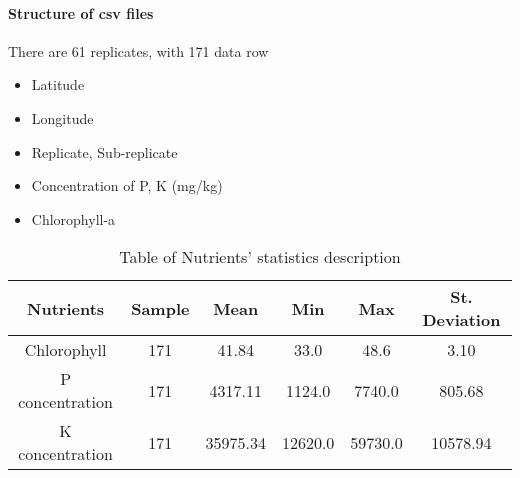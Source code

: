 \paragraph{Structure of csv files}
There are 61 replicates, with 171 data row
\begin{itemize}
    \item Latitude
    \item Longitude
    \item Replicate, Sub-replicate
    \item Concentration of P, K (mg/kg)
    \item Chlorophyll-a
\end{itemize}

\begin{table}[H]
    \centering
    \begin{tabular}{c c c c c c} 
        \hline
        \textbf{Nutrients } & \textbf{Sample} & \textbf{Mean} & \textbf{Min} & \textbf{Max} & \textbf{St. Deviation}  \\
        \hline
        Chlorophyll  & 171 & 41.84 & 33.0 & 48.6 & 3.10  \\
        P concentration & 171 & 4317.11 & 1124.0 & 7740.0 & 805.68  \\
        K concentration & 171 & 35975.34  & 12620.0 & 59730.0 & 10578.94  \\
        \hline
    \end{tabular}
    \caption{Table of Nutrients’ statistics description} \label{table:mem-page-to-mem-size}
\end{table}
